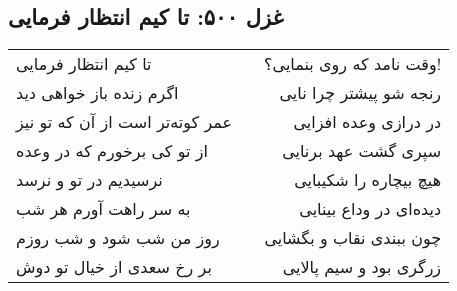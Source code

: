 \begin{center}
\section*{غزل ۵۰۰: تا کیم انتظار فرمایی}
\label{sec:500}
\begin{longtable}{l p{0.5cm} r}
تا کیم انتظار فرمایی
&&
وقت نامد که روی بنمایی؟!
\\
اگرم زنده باز خواهی دید
&&
رنجه شو پیشتر چرا نایی
\\
عمر کوته‌تر است از آن که تو نیز
&&
در درازی وعده افزایی
\\
از تو کی برخورم که در وعده
&&
سپری گشت عهد برنایی
\\
نرسیدیم در تو و نرسد
&&
هیچ بیچاره را شکیبایی
\\
به سر راهت آورم هر شب
&&
دیده‌ای در وداع بینایی
\\
روز من شب شود و شب روزم
&&
چون ببندی نقاب و بگشایی
\\
بر رخ سعدی از خیال تو دوش
&&
زرگری بود و سیم پالایی
\\
\end{longtable}
\end{center}
